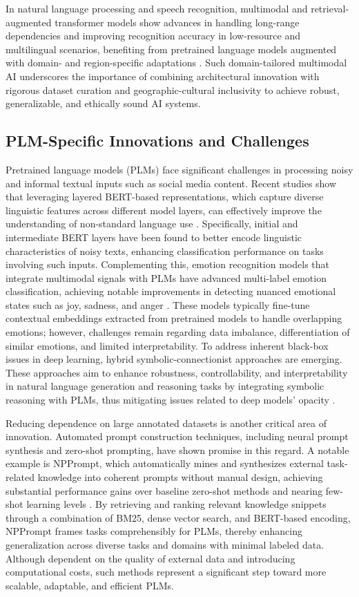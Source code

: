 \documentclass[sigconf]{acmart}
\begin{document}
In natural language processing and speech recognition, multimodal and retrieval-augmented transformer models show advances in handling long-range dependencies and improving recognition accuracy in low-resource and multilingual scenarios, benefiting from pretrained language models augmented with domain- and region-specific adaptations \cite{ref29,ref30,ref31,ref32}. Such domain-tailored multimodal AI underscores the importance of combining architectural innovation with rigorous dataset curation and geographic-cultural inclusivity to achieve robust, generalizable, and ethically sound AI systems.

\subsection{PLM-Specific Innovations and Challenges}

Pretrained language models (PLMs) face significant challenges in processing noisy and informal textual inputs such as social media content. Recent studies show that leveraging layered BERT-based representations, which capture diverse linguistic features across different model layers, can effectively improve the understanding of non-standard language use \cite{ref37}. Specifically, initial and intermediate BERT layers have been found to better encode linguistic characteristics of noisy texts, enhancing classification performance on tasks involving such inputs. Complementing this, emotion recognition models that integrate multimodal signals with PLMs have advanced multi-label emotion classification, achieving notable improvements in detecting nuanced emotional states such as joy, sadness, and anger \cite{ref36}. These models typically fine-tune contextual embeddings extracted from pretrained models to handle overlapping emotions; however, challenges remain regarding data imbalance, differentiation of similar emotions, and limited interpretability. To address inherent black-box issues in deep learning, hybrid symbolic-connectionist approaches are emerging. These approaches aim to enhance robustness, controllability, and interpretability in natural language generation and reasoning tasks by integrating symbolic reasoning with PLMs, thus mitigating issues related to deep models’ opacity \cite{ref39}.

Reducing dependence on large annotated datasets is another critical area of innovation. Automated prompt construction techniques, including neural prompt synthesis and zero-shot prompting, have shown promise in this regard. A notable example is NPPrompt, which automatically mines and synthesizes external task-related knowledge into coherent prompts without manual design, achieving substantial performance gains over baseline zero-shot methods and nearing few-shot learning levels \cite{ref40}. By retrieving and ranking relevant knowledge snippets through a combination of BM25, dense vector search, and BERT-based encoding, NPPrompt frames tasks comprehensibly for PLMs, thereby enhancing generalization across diverse tasks and domains with minimal labeled data. Although dependent on the quality of external data and introducing computational costs, such methods represent a significant step toward more scalable, adaptable, and efficient PLMs.
\end{document}
